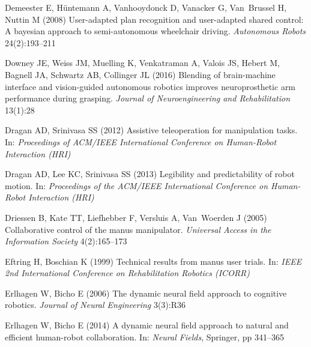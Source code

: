 \documentclass[natbib, twocolumn]{svjour3}          %
\begin{document}
\begin{thebibliography}{54}
	Demeester E, H{\"u}ntemann A, Vanhooydonck D, Vanacker G, Van~Brussel H, Nuttin
	M (2008) User-adapted plan recognition and user-adapted shared control: A
	bayesian approach to semi-autonomous wheelchair driving. \textit{Autonomous
		Robots} 24(2):193--211
	
	Downey JE, Weiss JM, Muelling K, Venkatraman A, Valois JS, Hebert M, Bagnell
	JA, Schwartz AB, Collinger JL (2016) Blending of brain-machine interface and
	vision-guided autonomous robotics improves neuroprosthetic arm performance
	during grasping. \textit{Journal of Neuroengineering and Rehabilitation}
	13(1):28
	
	Dragan AD, Srinivasa SS (2012) Assistive teleoperation for manipulation tasks.
	In: \textit{Proceedings of ACM/IEEE International Conference on Human-Robot
		Interaction (HRI)}
	
	Dragan AD, Lee KC, Srinivasa SS (2013) Legibility and predictability of robot
	motion. In: \textit{Proceedings of the ACM/IEEE International Conference on
		Human-Robot Interaction (HRI)}
	
	Driessen B, Kate TT, Liefhebber F, Versluis A, Van~Woerden J (2005)
	Collaborative control of the manus manipulator. \textit{Universal Access in
		the Information Society} 4(2):165--173
	
	Eftring H, Boschian K (1999) Technical results from manus user trials. In:
	\textit{IEEE 2nd International Conference on Rehabilitation Robotics (ICORR)}
	
	Erlhagen W, Bicho E (2006) The dynamic neural field approach to cognitive
	robotics. \textit{Journal of Neural Engineering} 3(3):R36
	
	Erlhagen W, Bicho E (2014) A dynamic neural field approach to natural and
	efficient human-robot collaboration. In: \textit{Neural Fields}, Springer, pp
	341--365
	

\end{thebibliography}
\end{document}
